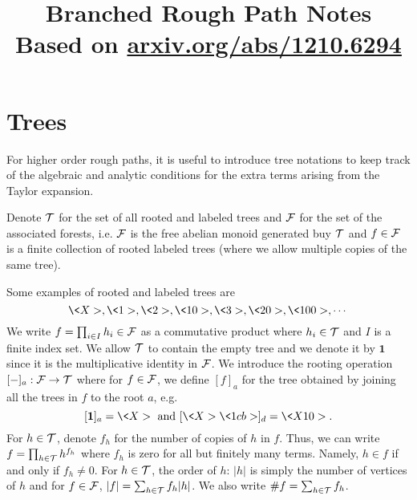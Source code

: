 \documentclass[11pt]{style/preprint}
\begin{document}
\title{Branched Rough Path Notes\\
  \large Based on \href{arxiv.org/abs/1210.6294}{arxiv.org/abs/1210.6294}}
\author{}
\institute{}
\maketitle


\section{Trees}


For higher order rough paths, it is useful to introduce tree notations to keep track of the 
algebraic and analytic conditions for the extra terms arising from the Taylor expansion.

\begin{definition}
  Denote \({\mathcal T}\) for the set of all rooted and labeled trees and \({\mathcal F}\) for the set of the associated 
  forests, i.e. \({\mathcal F}\) is the free abelian monoid generated buy \({\mathcal T}\) and \(f \in {\mathcal F}\) is a finite 
  collection of rooted labeled trees (where we allow multiple copies of the same tree).
\end{definition}

Some examples of rooted and labeled trees are 
\[\<X>, \<1>, \<2>, \<10>, \<3>, \<20>, \<100>, \cdots\]
We write \(f = \prod_{i \in I} h_i \in {\mathcal F}\) as a commutative product where \(h_i \in {\mathcal T}\) and \(I\) 
is a finite index set. We allow \({\mathcal T}\) to contain the empty tree and we denote it by \(\mathbf{1}\) 
since it is the multiplicative identity in \({\mathcal F}\). We introduce the rooting operation \([-]_a : {\mathcal F} \to {\mathcal T}\) where 
for \(f \in {\mathcal F}\), we define \([f]_a\) for the tree obtained by joining all the trees in \(f\) to the
root \(a\), e.g. 
\[[\mathbf{1}]_a = \<X> \text{ and } [\<X> \<1cb>]_d = \<X10>.\]
For \(h \in {\mathcal T}\), denote \(f_h\) for the number of copies of \(h\) in \(f\). Thus, we can write 
\(f = \prod_{h \in {\mathcal T}} h^{f_h}\)
where \(f_h\) is zero for all but finitely many terms. Namely, \(h \in f\) if and only if 
\(f_h \neq 0\). For \(h \in {\mathcal T}\), the order of \(h\): \(|h|\) is simply the number of vertices of 
\(h\) and for \(f \in {\mathcal F}\), \(|f| = \sum_{h \in {\mathcal T}} f_h |h|\). We also write \(\#f = \sum_{h \in {\mathcal T}} f_h\).
\end{document}
